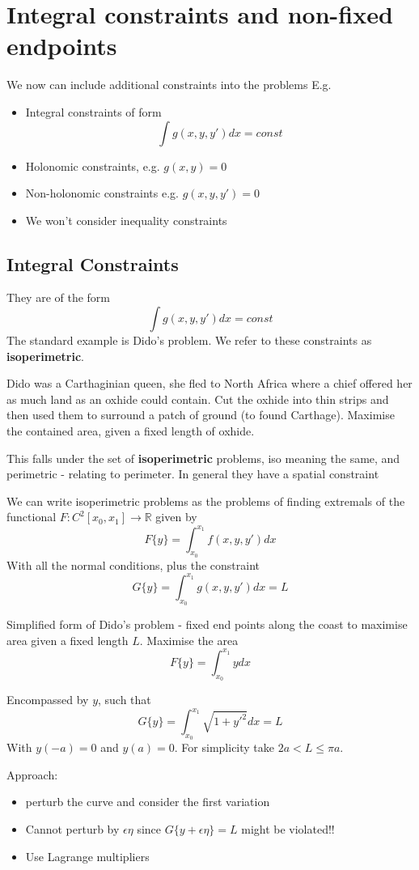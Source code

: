 \documentclass{E:/Documents/Latex/myassignment}
\begin{document}
\section{Integral constraints and non-fixed endpoints}
We now can include additional constraints into the problems
E.g.
\begin{itemize}
	\item Integral constraints of form
	\[\int g(x,y,y') dx = const\]
	\item Holonomic constraints, e.g. $g(x,y) = 0$
	\item Non-holonomic constraints e.g. $g(x,y,y') =0$
	\item We won't consider inequality constraints
\end{itemize}
\subsection{Integral Constraints}
They are of the form
\[\int g(x,y,y') dx = const\]
The standard example is Dido's problem. We refer to these constraints as \textbf{isoperimetric}.

Dido was a Carthaginian queen, she fled to North Africa where a chief offered her as much land as an oxhide could contain. Cut the oxhide into thin strips and then used them to surround a patch of ground (to found Carthage). Maximise the contained area, given a fixed length of oxhide.

This falls under the set of \textbf{isoperimetric} problems, iso meaning the same, and perimetric - relating to perimeter.
In general they have a spatial constraint

We can write isoperimetric problems as the problems of finding extremals of the functional $F: C^2[x_0,x_1] \to \mathbb{R}$ given by
\[F\{y\} = \int_{x_0}^{x_1} f(x,y,y') dx\]
With all the normal conditions, plus the constraint
\[G\{y\} = \int_{x_0}^{x_1} g(x,y,y') dx = L\]



Simplified form of Dido's problem - fixed end points along the coast to maximise area given a fixed length $L$. 
Maximise the area
\[F\{y\} = \int_{x_0}^{x_1} y dx\]

Encompassed by $y$, such that
\[G\{y\} = \int_{x_0}^{x_1} \sqrt{1+y'^2} dx = L\]
With $y(-a) = 0$ and $y(a) = 0$.
For simplicity take $2a < L \leq \pi a$.

Approach:
\begin{itemize}
	\item perturb the curve and consider the first variation
	\item Cannot perturb by $\epsilon \eta$ since $G\{y + \epsilon \eta\} = L$ might be violated!!
	\item Use Lagrange multipliers
\end{itemize}
\end{document}
